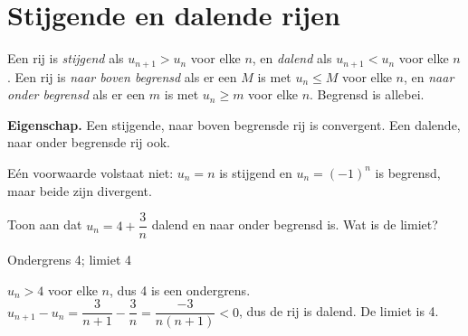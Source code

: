 \section{Stijgende en dalende rijen}

\begin{theorie}
Een rij is \emph{stijgend} als $u_{n+1} > u_n$ voor elke $n$, en \emph{dalend} als $u_{n+1} < u_n$ voor elke $n$. Een rij is \emph{naar boven begrensd} als er een $M$ is met $u_n \leqslant M$ voor elke $n$, en \emph{naar onder begrensd} als er een $m$ is met $u_n \geqslant m$ voor elke $n$. Begrensd is allebei.

\vspace{1.5mm}
\textbf{Eigenschap.} Een stijgende, naar boven begrensde rij is convergent. Een dalende, naar onder begrensde rij ook.
\end{theorie}

Eén voorwaarde volstaat niet: $u_n = n$ is stijgend en $u_n = (-1)^n$ is begrensd, maar beide zijn divergent.



\begin{oefeningen}
\begin{oefening}
Toon aan dat $u_n = 4 + \dfrac{3}{n}$ dalend en naar onder begrensd is. Wat is de limiet?
\begin{solution}
Ondergrens 4; limiet 4
\end{solution}
\begin{fullsolution}
$u_n>4$ voor elke $n$, dus 4 is een ondergrens. $u_{n+1}-u_n=\dfrac{3}{n+1}-\dfrac3n=\dfrac{-3}{n(n+1)}<0$, dus de rij is dalend. De limiet is 4.
\end{fullsolution}
\end{oefening}
\end{oefeningen}

